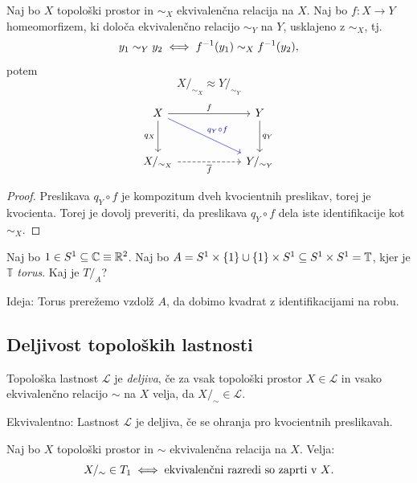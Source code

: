 \begin{trditev}
    Naj bo \(X\) topološki prostor in \(\sim_X\) ekvivalenčna relacija na \(X\). Naj bo \(f: X \to Y\) homeomorfizem, ki določa ekvivalenčno relacijo \(\sim_Y\) na \(Y\), usklajeno z \(\sim_X\), tj. 
    \[y_1 \sim_Y y_2 \iff f^{-1}(y_1) \sim_X f^{-1}(y_2),\]
    potem \[X/_{\sim_X} \approx Y/_{\sim_Y}\]
    \[
        \begin{tikzcd}[column sep=2cm, row sep=1cm]
            X \arrow{r}{f} \arrow[swap]{d}{q_X} \arrow[draw=blue]{rd}{\textcolor{blue}{q_Y \circ f}} & Y \arrow{d}{q_Y} \\
            X/_{\sim_X} \arrow[dashed, swap]{r}{\overline{f}} & Y/_{\sim_Y}
        \end{tikzcd}
    \]
\end{trditev}
\begin{proof}
    Preslikava \(q_Y \circ f\) je kompozitum dveh kvocientnih preslikav, torej je kvocienta. Torej je dovolj preveriti, da preslikava \(q_Y \circ f\) dela iste identifikacije kot \(\sim_X\).
\end{proof}

\begin{primer}
    Naj bo \(1 \in S^1 \subseteq \mathbb{C} \equiv \mathbb{R}^2\). Naj bo \(A = S^1 \times \left\{1\right\} \cup \left\{1\right\} \times S^1 \subseteq S^1 \times S^1 = \mathbb{T}\), kjer je \(\mathbb{T}\) \emph{torus}. Kaj je \(T/_A\)?

    Ideja: Torus prerežemo vzdolž \(A\), da dobimo kvadrat z identifikacijami na robu.
\end{primer}

\subsection{Deljivost topoloških lastnosti}
\begin{definicija}
    Topološka lastnost \(\mathcal{L}\) je \emph{deljiva}, če za vsak topološki prostor \(X \in \mathcal{L}\) in vsako ekvivalenčno relacijo \(\sim\) na \(X\) velja, da \(X/_\sim \in \mathcal{L}\).

    Ekvivalentno: Lastnost \(\mathcal{L}\) je deljiva, če se ohranja pro kvocientnih preslikavah.
\end{definicija}

\begin{trditev}
    Naj bo \(X\) topološki prostor in \(\sim\) ekvivalenčna relacija na \(X\). Velja:
    \[X/_\sim \in T_1 \iff \text{ekvivalenčni razredi so zaprti v \(X\)}.\]
\end{trditev}

